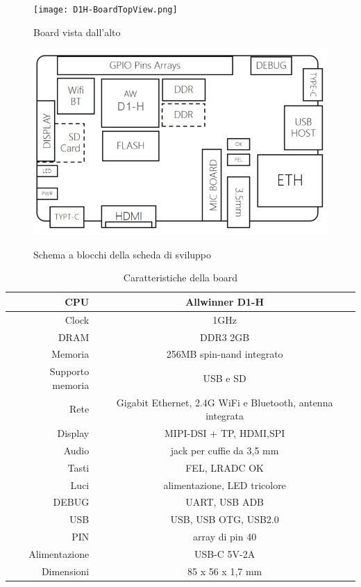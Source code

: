 \documentclass[12pt, a4paper]{report}
\begin{document}
\begin{figure}[!ht]
\texttt{[image: D1H-BoardTopView.png]}
\caption{Board vista dall'alto}

\includegraphics[width = \textwidth]{D1H-BoardBlockView.png}
\caption{Schema a blocchi della scheda di sviluppo}\cite{BoardInfo}
\end{figure}

\vspace{2cm}

\begin{table}[!ht]
\centering
\begin{tabular}{| r | c |}
\hline
CPU & Allwinner D1-H \\
\hline
Clock & 1GHz\\
\hline
DRAM & DDR3 2GB\\
\hline
Memoria & 256MB spin-nand integrato\\
\hline 
Supporto memoria & USB e SD\\
\hline
Rete & Gigabit Ethernet, 2.4G WiFi e Bluetooth, antenna integrata\\
\hline
Display & MIPI-DSI + TP, HDMI,SPI \\
\hline
Audio & jack per cuffie da 3,5 mm\\
\hline
Tasti & FEL, LRADC OK\\
\hline
Luci & alimentazione, LED tricolore\\
\hline
DEBUG & UART, USB ADB\\
\hline
USB & USB, USB OTG, USB2.0\\
\hline
PIN & array di pin 40\\
\hline
Alimentazione & USB-C 5V-2A\\
\hline
Dimensioni & 85 x 56 x 1,7 mm\\
\hline

\end{tabular}
\caption{Caratteristiche della board}
\end{table}
\end{document}

